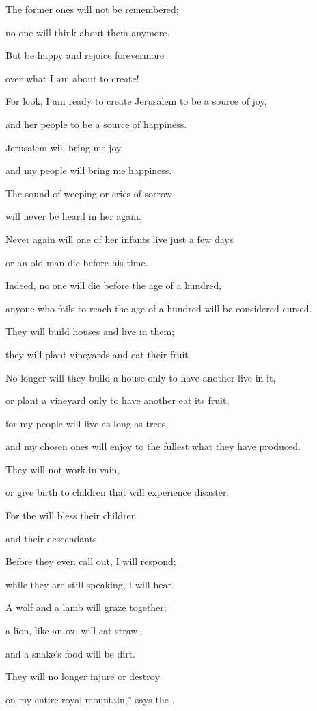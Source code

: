 {\par }{\Q The former
ones will not be remembered;
\par }{\Q no one will think
about them anymore.
\par }{\Q {}But
be happy
and rejoice
forevermore
\par }{\Q over what I
am about to create!
\par }{\Q For
look,
I am ready to create
Jerusalem
to be a source of joy,
\par }{\Q and her people
to be a source of happiness.
\par }{\Q {}Jerusalem
will bring me joy,
\par }{\Q and my people
will bring me
happiness.
\par }{\Q The sound
of weeping
or cries
of sorrow
\par }{\Q will never
be heard
in her again.
\par }{\Q {}Never
again
will one of her infants
live just a few days
\par }{\Q or an old man
die before
his time.
\par }{\Q Indeed,
no one will die before the age
of a hundred,
\par }{\Q anyone who fails to reach
the age
of a hundred
will be considered cursed.
\par }{\Q {}They will build
houses
and live
in them;
\par }{\Q they will plant
vineyards
and eat
their fruit.
\par }{\Q {}No
longer will they build
a house only to have another
live in it,
\par }{\Q or
plant
a vineyard only to have another
eat
its fruit,

\par }{\Q for
my people
will live as long as
trees,
\par }{\Q and my chosen ones
will enjoy to the fullest
what they have produced.
\par }{\Q {}They will not
work
in vain,
\par }{\Q or
give birth
to children that will experience disaster.
\par }{\Q For
the
{}
will bless
their
children
\par }{\Q and their descendants.
\par }{\Q {}Before
they even call
out, I
will respond;
\par }{\Q while they are
still
speaking,
I
will hear.
\par }{\Q {}A wolf
and a lamb
will graze
together;
\par }{\Q a lion,
like an ox,
will eat
straw,
\par }{\Q and a snake’s
food
will be dirt.
\par }{\Q They will no
longer injure
or
destroy
\par }{\Q on
my entire
royal
mountain,”
says
the {}.

}

